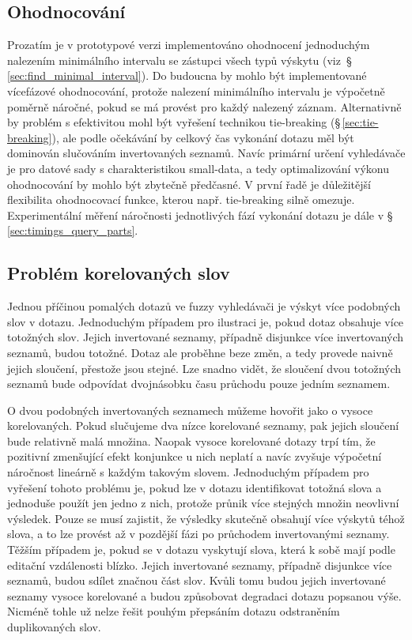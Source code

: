 \documentclass[11pt,letterpaper,oneside,openright]{book}
\begin{document}
\subsection{Ohodnocování}
Prozatím je v prototypové verzi implementováno ohodnocení jednoduchým nalezením
minimálního intervalu se zástupci všech typů výskytu
(viz~\S\,\ref{sec:find_minimal_interval}). Do budoucna by mohlo být
implementované vícefázové ohodnocování, protože nalezení minimálního intervalu
je výpočetně poměrně náročné, pokud se má provést pro každý nalezený záznam.
Alternativně by problém s efektivitou mohl být vyřešení technikou tie-breaking
(\S\,\ref{sec:tie-breaking}), ale podle očekávání by celkový čas vykonání
dotazu měl být dominován slučováním invertovaných seznamů. Navíc primární
určení vyhledávače je pro datové sady s charakteristikou small-data, a tedy
optimalizování výkonu ohodnocování by mohlo být zbytečně předčasné. V první
řadě je důležitější flexibilita ohodnocovací funkce, kterou např. tie-breaking
silně omezuje. Experimentální měření náročnosti jednotlivých fází vykonání
dotazu je dále v \S\,\ref{sec:timings_query_parts}.


\subsection{Problém korelovaných slov} \label{sec:correlated_words}
Jednou příčinou pomalých dotazů ve fuzzy vyhledávači je výskyt více podobných
slov v dotazu. Jednoduchým případem pro ilustraci je, pokud dotaz obsahuje více
totožných slov. Jejich invertované seznamy, případně disjunkce více
invertovaných seznamů, budou totožné. Dotaz ale proběhne beze změn, a tedy
provede naivně jejich sloučení, přestože jsou stejné. Lze snadno vidět, že
sloučení dvou totožných seznamů bude odpovídat dvojnásobku času průchodu pouze
jedním seznamem.

O dvou podobných invertovaných seznamech můžeme hovořit jako o vysoce
korelovaných. Pokud slučujeme dva nízce korelované seznamy, pak jejich sloučení
bude relativně malá množina. Naopak vysoce korelované dotazy trpí tím, že
pozitivní zmenšující efekt konjunkce u nich neplatí a navíc zvyšuje výpočetní
náročnost lineárně s každým takovým slovem.  Jednoduchým případem pro vyřešení
tohoto problému je, pokud lze v dotazu identifikovat totožná slova a jednoduše
použít jen jedno z nich, protože průnik více stejných množin neovlivní
výsledek. Pouze se musí zajistit, že výsledky skutečně obsahují více výskytů
téhož slova, a to lze provést až v pozdější fázi po průchodem invertovanými
seznamy.  Těžším případem je, pokud se v dotazu vyskytují slova, která k sobě
mají podle editační vzdálenosti blízko.  Jejich invertované seznamy, případně
disjunkce více seznamů, budou sdílet značnou část slov. Kvůli tomu budou jejich
invertované seznamy vysoce korelované a budou způsobovat degradaci dotazu
popsanou výše. Nicméně tohle už nelze řešit pouhým přepsáním dotazu odstraněním
duplikovaných slov.
\end{document}

